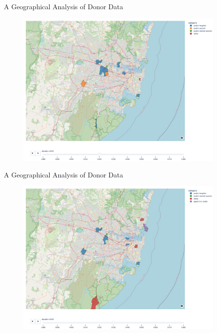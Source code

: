 \documentclass[]{beamer}
\begin{document}
\begin{frame}{A Geographical Analysis of Donor Data}
	\begin{figure}
		\includegraphics[width=0.92\textwidth]{img/choropleth_time/choropleth-5.png}
	\end{figure}
\end{frame}


\begin{frame}{A Geographical Analysis of Donor Data}
	\begin{figure}
		\includegraphics[width=0.92\textwidth]{img/choropleth_time/choropleth-6.png}
	\end{figure}
\end{frame}
\end{document}
